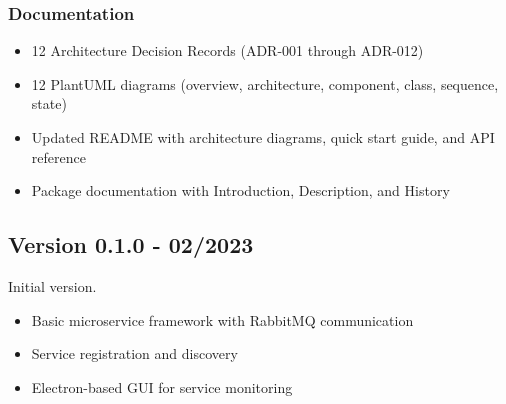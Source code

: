\subsubsection{Documentation}

\begin{itemize}
   \item 12 Architecture Decision Records (ADR-001 through ADR-012)
   \item 12 PlantUML diagrams (overview, architecture, component, class, sequence, state)
   \item Updated README with architecture diagrams, quick start guide, and API reference
   \item Package documentation with Introduction, Description, and History
\end{itemize}

\subsection{Version 0.1.0 - 02/2023}

Initial version.

\begin{itemize}
   \item Basic microservice framework with RabbitMQ communication
   \item Service registration and discovery
   \item Electron-based GUI for service monitoring
\end{itemize}
